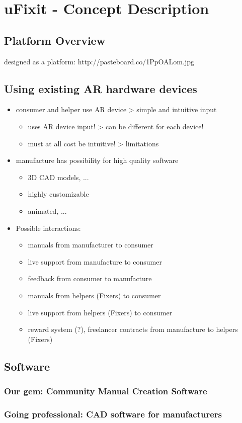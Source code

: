 
\chapter{uFixit - Concept Description}

	\section{Platform Overview}
	
		designed as a platform: http://pasteboard.co/1PpOALom.jpg
	
	\section{Using existing AR hardware devices}
	
		\begin{itemize}
			\itemsep0em
			\item consumer and helper use AR device > simple and intuitive input \begin{itemize}
				\itemsep0em
				\item uses AR device input! > can be different for each device!
				\item must at all cost be intuitive! > limitations
			\end{itemize}
			\item manufacture has possibility for high quality software \begin{itemize}
				\itemsep0em
				\item 3D CAD models, ...
				\item highly customizable
				\item animated, ...
			\end{itemize}
			\item Possible interactions: \begin{itemize}
				\itemsep0em
				\item manuals from manufacturer to consumer
				\item live support from manufacture to consumer
				\item feedback from consumer to manufacture
				\item manuals from helpers (Fixers) to consumer
				\item live support from helpers (Fixers) to consumer
				\item reward system (?), freelancer contracts from manufacture to helpers (Fixers)
			\end{itemize}
		\end{itemize}

	\section{Software}
		
		\subsection{Our gem: Community Manual Creation Software}
	
		\subsection{Going professional: CAD software for manufacturers}
